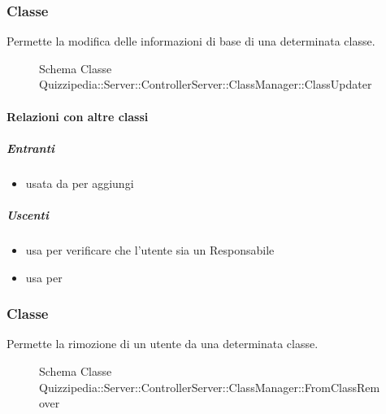 \subsubsection{Classe }
Permette la modifica delle informazioni di base di una determinata classe.
\begin{figure}[H]
\centering
\noindent{}
\caption[Schema Classe ClassUpdater]{Schema Classe Quizzipedia::Server::ControllerServer::ClassManager::ClassUpdater}
\end{figure}
\paragraph{Relazioni con altre classi}
\subparagraph{Entranti}
\begin{itemize}
\item usata da  per aggiungi
\end{itemize}
\subparagraph{Uscenti}
\begin{itemize}
\item usa  per verificare che l'utente sia un Responsabile
\item usa  per 
\end{itemize}
\subsubsection{Classe }
Permette la rimozione di un utente da una determinata classe.
\begin{figure}[H]
\centering
\noindent{}
\caption[Schema Classe FromClassRemover]{Schema Classe Quizzipedia::Server::ControllerServer::ClassManager::FromClassRemover}
\end{figure}
